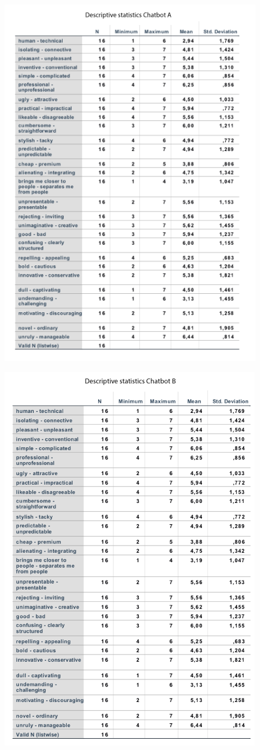   \begin{figure}
        \centering
        \includegraphics[scale=0.8]{figures/DescriptiveChatbotA.png}
        \label{fig:deschatA}
    \end{figure}
    
    \begin{figure}
        \centering
        \includegraphics[scale=0.8]{figures/DescriptiveChatbotB.png}
        \label{fig:deschatB}
    \end{figure}


